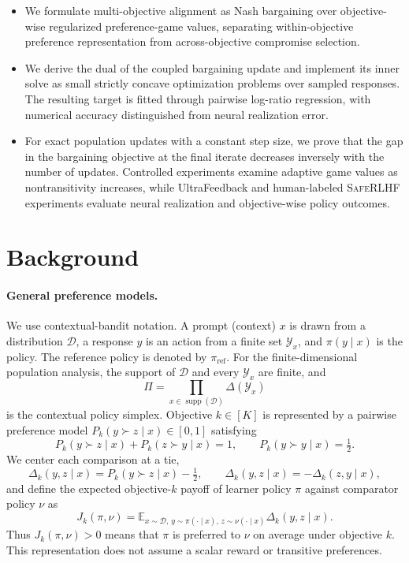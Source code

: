 \documentclass{article}
\theoremstyle{remark}
\theoremstyle{plain}
\newcommand{\Y}{\mathcal{Y}}
\newcommand{\E}{\mathbb{E}}
\newcommand{\D}{\mathcal{D}}
\newcommand{\piref}{\pi_{\mathrm{ref}}}
\begin{document}
\begin{itemize}
    \item We formulate multi-objective alignment as Nash bargaining over objective-wise regularized preference-game values, separating within-objective preference representation from across-objective compromise selection.
    \item We derive the dual of the coupled bargaining update and implement its inner solve as small strictly concave optimization problems over sampled responses. The resulting target is fitted through pairwise log-ratio regression, with numerical accuracy distinguished from neural realization error.
    \item For exact population updates with a constant step size, we prove that the gap in the bargaining objective at the final iterate decreases inversely with the number of updates. Controlled experiments examine adaptive game values as nontransitivity increases, while UltraFeedback and human-labeled \textsc{SafeRLHF} experiments evaluate neural realization and objective-wise policy outcomes.
\end{itemize}

\section{Background}
\label{sec:background}
\paragraph{General preference models.}
We use contextual-bandit notation. A prompt (context) $x$ is drawn from a distribution $\D$, a response $y$ is an action from a finite set $\Y_x$, and $\pi(y\mid x)$ is the policy. The reference policy is denoted by $\piref$. For the finite-dimensional population analysis, the support of $\D$ and every $\Y_x$ are finite, and
\[
\Pi=\prod_{x\in\operatorname{supp}(\D)}\Delta(\Y_x)
\]
is the contextual policy simplex. Objective $k\in[K]$ is represented by a pairwise preference model $P_k(y\succ z\mid x)\in[0,1]$ satisfying
\begin{equation}
P_k(y\succ z\mid x)+P_k(z\succ y\mid x)=1,
\qquad
P_k(y\succ y\mid x)=\tfrac12.
\label{eq:skew}
\end{equation}
We center each comparison at a tie,
\begin{equation}
\Delta_k(y,z\mid x)
=
P_k(y\succ z\mid x)-\tfrac12,
\qquad
\Delta_k(y,z\mid x)=-\Delta_k(z,y\mid x),
\label{eq:centered}
\end{equation}
and define the expected objective-$k$ payoff of learner policy $\pi$ against comparator policy $\nu$ as
\begin{equation}
J_k(\pi,\nu)
=
\E_{x\sim\D,\,y\sim\pi(\cdot\mid x),\,z\sim\nu(\cdot\mid x)}
\Delta_k(y,z\mid x).
\label{eq:game-payoff}
\end{equation}
Thus $J_k(\pi,\nu)>0$ means that $\pi$ is preferred to $\nu$ on average under objective $k$. This representation does not assume a scalar reward or transitive preferences.
\end{document}
